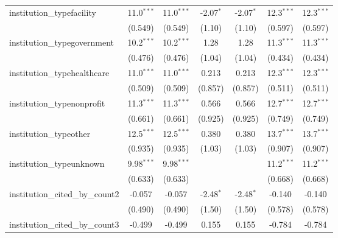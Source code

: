 \begin{tabular}{lcccccc}
   institution\_typefacility             & 11.0$^{***}$   & 11.0$^{***}$   & -2.07$^{*}$   & -2.07$^{*}$   & 12.3$^{***}$  & 12.3$^{***}$\\   
                                         & (0.549)        & (0.549)        & (1.10)        & (1.10)        & (0.597)       & (0.597)\\   
   institution\_typegovernment           & 10.2$^{***}$   & 10.2$^{***}$   & 1.28          & 1.28          & 11.3$^{***}$  & 11.3$^{***}$\\   
                                         & (0.476)        & (0.476)        & (1.04)        & (1.04)        & (0.434)       & (0.434)\\   
   institution\_typehealthcare           & 11.0$^{***}$   & 11.0$^{***}$   & 0.213         & 0.213         & 12.3$^{***}$  & 12.3$^{***}$\\   
                                         & (0.509)        & (0.509)        & (0.857)       & (0.857)       & (0.511)       & (0.511)\\   
   institution\_typenonprofit            & 11.3$^{***}$   & 11.3$^{***}$   & 0.566         & 0.566         & 12.7$^{***}$  & 12.7$^{***}$\\   
                                         & (0.661)        & (0.661)        & (0.925)       & (0.925)       & (0.749)       & (0.749)\\   
   institution\_typeother                & 12.5$^{***}$   & 12.5$^{***}$   & 0.380         & 0.380         & 13.7$^{***}$  & 13.7$^{***}$\\   
                                         & (0.935)        & (0.935)        & (1.03)        & (1.03)        & (0.907)       & (0.907)\\   
   institution\_typeunknown              & 9.98$^{***}$   & 9.98$^{***}$   &               &               & 11.2$^{***}$  & 11.2$^{***}$\\   
                                         & (0.633)        & (0.633)        &               &               & (0.668)       & (0.668)\\   
   institution\_cited\_by\_count2        & -0.057         & -0.057         & -2.48$^{*}$   & -2.48$^{*}$   & -0.140        & -0.140\\   
                                         & (0.490)        & (0.490)        & (1.50)        & (1.50)        & (0.578)       & (0.578)\\   
   institution\_cited\_by\_count3        & -0.499         & -0.499         & 0.155         & 0.155         & -0.784        & -0.784\\   

\end{tabular}
